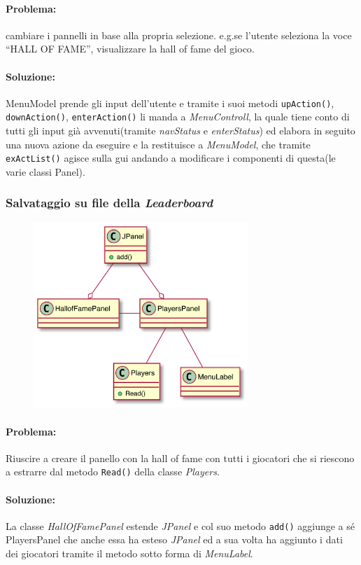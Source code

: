 \documentclass[a4paper,12pt]{report}
\begin{document}
\paragraph{Problema:} cambiare i pannelli in base alla propria selezione.
e.g.se l’utente seleziona la voce “HALL OF FAME”, visualizzare la hall of fame del gioco.
\paragraph{Soluzione:} MenuModel prende gli input dell’utente e tramite i suoi metodi \texttt{upAction()}, \texttt{downAction()}, \texttt{enterAction()} li manda a \emph{MenuControll}, la quale tiene conto di tutti gli input già avvenuti(tramite \emph{navStatus} e \emph{enterStatus}) ed elabora in seguito una nuova azione da eseguire e la restituisce a \emph{MenuModel}, che tramite \texttt{exActList()} agisce sulla gui andando a modificare i componenti di questa(le varie classi Panel).

\subsubsection{Salvataggio su file della \emph{Leaderboard}}
    \begin{figure}[H]
    \centering
    \includegraphics[height=7cm]{img/ez/6.png}
\end{figure}
\paragraph{Problema:} Riuscire a creare il panello con la hall of fame con tutti i giocatori che si riescono a estrarre dal metodo \texttt{Read()} della classe \emph{Players}.
\paragraph{Soluzione:}La classe \emph{HallOfFamePanel}  estende \emph{JPanel} e col suo metodo \texttt{add()} aggiunge a sé PlayersPanel che anche essa ha esteso \emph{JPanel} ed a sua volta ha aggiunto i dati dei giocatori tramite il metodo \texttt{} sotto forma di \emph{MenuLabel}.
\end{document}
